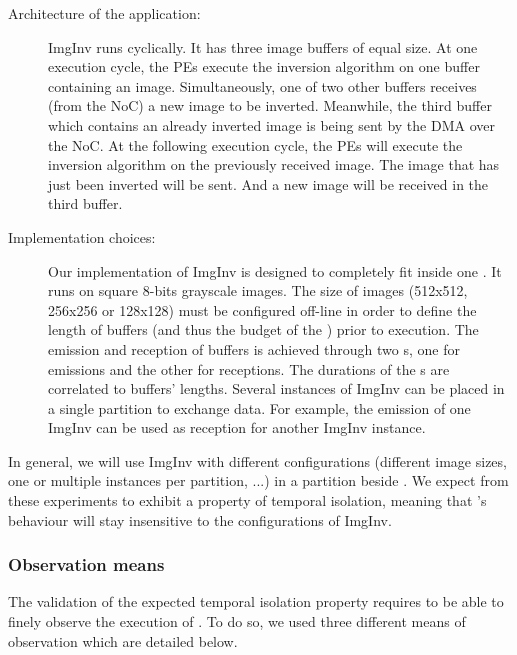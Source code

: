 \documentclass[main.tex]{subfiles}
\begin{document}
\begin{description}
    \item[Architecture of the application: ] ImgInv runs cyclically. It has
        three image buffers of equal size. At one execution cycle, the PEs
        execute the inversion algorithm on one buffer containing an image.
        Simultaneously, one of two other buffers receives (from the NoC) a new
        image to be inverted. Meanwhile, the third buffer which contains an
        already inverted image is being sent by the DMA over the NoC. At the
        following execution cycle, the PEs will execute the inversion algorithm
        on the previously received image. The image that has just been inverted
        will be sent. And a new image will be received in the third buffer.
    \item[Implementation choices: ] Our implementation of ImgInv is designed to
        completely fit inside one \PN{}. It runs on square 8-bits grayscale
        images. The size of images (512x512, 256x256 or 128x128) must be
        configured off-line in order to define the length of buffers (and thus
        the budget of the \PN{}) prior to execution. The emission and reception
        of buffers is achieved through two \PC{}s, one for emissions and the
        other for receptions. The durations of the \PC{}s are correlated to
        buffers' lengths. Several instances of ImgInv can be placed in a single
        partition to exchange data. For example, the emission \PC{} of one
        ImgInv \PN{} can be used as reception \PC{} for another ImgInv
        instance.
\end{description}

In general, we will use ImgInv with different configurations (different image
sizes, one or multiple instances per partition, ...) in a partition beside
\rosace. We expect from these experiments to exhibit a property of temporal
isolation, meaning that \rosace's behaviour will stay insensitive to the
configurations of ImgInv.

\subsubsection{Observation means} The validation of the expected temporal
isolation property requires to be able to finely observe the execution of
\rosace. To do so, we used three different means of observation which are
detailed below.
\end{document}
